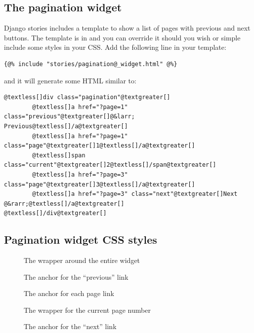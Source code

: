 \documentclass[letterpaper,10pt,english]{manual}
\begin{document}
\subsection{The pagination widget}

Django stories includes a template to show a list of pages with previous and next buttons. The template is in  and you can override it should you wish or simple include some styles in your CSS. Add the following line in your template:

\begin{Verbatim}[commandchars=@\[\]]
{@% include "stories/pagination@_widget.html" @%}
\end{Verbatim}

and it will generate some HTML similar to:

\begin{Verbatim}[commandchars=@\[\]]
@textless[]div class="pagination"@textgreater[]
        @textless[]a href="?page=1" class="previous"@textgreater[]@&larr; Previous@textless[]/a@textgreater[]
        @textless[]a href="?page=1" class="page"@textgreater[]1@textless[]/a@textgreater[]
        @textless[]span class="current"@textgreater[]2@textless[]/span@textgreater[]
        @textless[]a href="?page=3" class="page"@textgreater[]3@textless[]/a@textgreater[]
        @textless[]a href="?page=3" class="next"@textgreater[]Next @&rarr;@textless[]/a@textgreater[]
@textless[]/div@textgreater[]
\end{Verbatim}


\subsection{Pagination widget CSS styles}
\begin{description}
\item[] \leavevmode
The wrapper around the entire widget

\item[] \leavevmode
The anchor for the ``previous'' link

\item[] \leavevmode
The anchor for each page link

\item[] \leavevmode
The wrapper for the current page number

\item[] \leavevmode
The anchor for the ``next'' link

\end{description}
\end{document}
